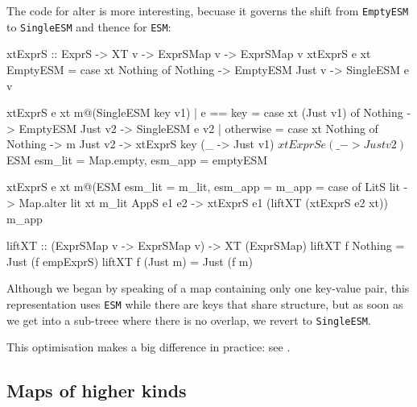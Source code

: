 \documentclass[format=sigplan]{acmart}
\theoremstyle{theorem}
\theoremstyle{definition}
\theoremstyle{remark}
\begin{document}
The code for alter is more interesting, becuase it governs the shift from
\lstinline{EmptyESM} to \lstinline{SingleESM} and thence for \lstinline{ESM}:
\begin{code}
  xtExprS  :: ExprS -> XT v -> ExprSMap v -> ExprSMap v
  xtExprS e xt EmptyESM
    = case xt Nothing of
        Nothing -> EmptyESM
        Just v  -> SingleESM e v

  xtExprS e xt m@(SingleESM key v1)
    | e == key
    = case xt (Just v1) of
        Nothing -> EmptyESM
        Just v2  -> SingleESM e v2
    | otherwise
    = case xt Nothing of
        Nothing -> m
        Just v2 -> xtExprS key (\_ -> Just v1) $
                   xtExprS e   (\_ -> Just v2) $
                   ESM { esm_lit = Map.empty, esm_app = emptyESM }

  xtExprS e xt m@(ESM { esm_lit = m_lit, esm_app = m_app }
    = case of
        LitS lit   -> Map.alter lit xt m_lit
        AppS e1 e2 -> xtExprS e1 (liftXT (xtExprS e2 xt)) m_app

  liftXT :: (ExprSMap v -> ExprSMap v) -> XT (ExprSMap)
  liftXT f Nothing  = Just (f empExprS)
  liftXT f (Just m) = Just (f m)
\end{code}
Although we began by speaking of a map containing only one key-value pair,
this representation uses \lstinline{ESM} while there are keys that share structure,
but as soon as we get into a sub-treee where there is no overlap, we revert
to \lstinline{SingleESM}.

This optimisation makes a big difference in practice: see .

\subsection{Maps of higher kinds}
\end{document}
